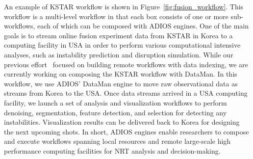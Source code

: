 An example of KSTAR workflow is shown in Figure~\ref{fig:fusion_workflow}. This workflow is a multi-level workflow in that each box consists of one or more sub-workflows, each of which can be composed with ADIOS engines. One of the main goals is to stream online fusion experiment data from KSTAR in Korea to a computing facility in USA in order to perform various computational intensive analyses, such as instability prediction and disruption simulation. 
While our previous effort~\cite{choi2013icee} focused on building remote workflows with data indexing, we are currently working on composing the KSTAR workflow with DataMan. In this workflow, we use ADIOS' DataMan engine to move raw observational data as streams from Korea to the USA. Once data streams arrived in a USA computing facility, we launch a set of analysis and visualization workflows to perform denoising, segmentation, feature detection, and selection for detecting any instabilities. 
Visualization results can be delivered back to Korea for designing the next upcoming shots. 
In short, ADIOS engines enable researchers to compose and execute workflows spanning local resources and remote large-scale high performance computing facilities for NRT analysis and decision-making. 



